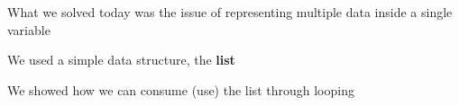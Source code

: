 \documentclass{beamer}
\begin{document}
\begin{slide}{
\item What we solved today was the issue of representing multiple data inside a single variable
\item We used a simple data structure, the \textbf{list}
\item We showed how we can consume (use) the list through looping
}\end{slide}

\begin{thankyou}{
}\end{thankyou}
\end{document}
